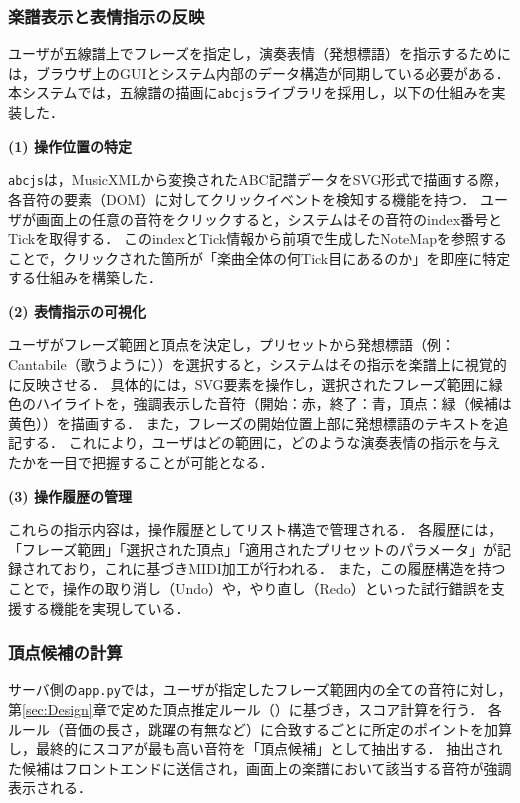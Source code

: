 \subsubsection{楽譜表示と表情指示の反映} \label{sec:Rendering}
ユーザが五線譜上でフレーズを指定し，演奏表情（発想標語）を指示するためには，ブラウザ上のGUIとシステム内部のデータ構造が同期している必要がある．
本システムでは，五線譜の描画に\texttt{abcjs}ライブラリを採用し，以下の仕組みを実装した．

\noindent \textbf{(1) 操作位置の特定}

\texttt{abcjs}は，MusicXMLから変換されたABC記譜データをSVG形式で描画する際，各音符の要素（DOM）に対してクリックイベントを検知する機能を持つ．
ユーザが画面上の任意の音符をクリックすると，システムはその音符のindex番号とTickを取得する．
このindexとTick情報から前項で生成したNoteMapを参照することで，クリックされた箇所が「楽曲全体の何Tick目にあるのか」を即座に特定する仕組みを構築した．

\noindent \textbf{(2) 表情指示の可視化}

ユーザがフレーズ範囲と頂点を決定し，プリセットから発想標語（例：Cantabile（歌うように））を選択すると，システムはその指示を楽譜上に視覚的に反映させる．
具体的には，SVG要素を操作し，選択されたフレーズ範囲に緑色のハイライトを，強調表示した音符（開始：赤，終了：青，頂点：緑（候補は黄色））を描画する．
また，フレーズの開始位置上部に発想標語のテキストを追記する．
これにより，ユーザはどの範囲に，どのような演奏表情の指示を与えたかを一目で把握することが可能となる．

\noindent \textbf{(3) 操作履歴の管理}

これらの指示内容は，操作履歴としてリスト構造で管理される．
各履歴には，「フレーズ範囲」「選択された頂点」「適用されたプリセットのパラメータ」が記録されており，これに基づきMIDI加工が行われる．
また，この履歴構造を持つことで，操作の取り消し（Undo）や，やり直し（Redo）といった試行錯誤を支援する機能を実現している．


\subsubsection{頂点候補の計算}
サーバ側の\texttt{app.py}では，ユーザが指定したフレーズ範囲内の全ての音符に対し，第\ref{sec:Design}章で定めた頂点推定ルール（）に基づき，スコア計算を行う．
各ルール（音価の長さ，跳躍の有無など）に合致するごとに所定のポイントを加算し，最終的にスコアが最も高い音符を「頂点候補」として抽出する．
抽出された候補はフロントエンドに送信され，画面上の楽譜において該当する音符が強調表示される．


